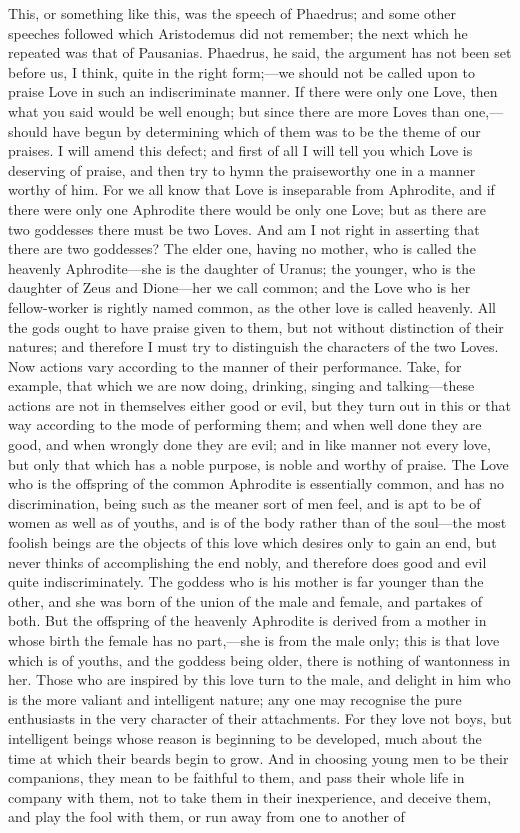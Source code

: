\documentclass[11pt,letter]{article}
\begin{document}
\par  This, or something like this, was the speech of Phaedrus; and some other speeches followed which Aristodemus did not remember; the next which he repeated was that of Pausanias. Phaedrus, he said, the argument has not been set before us, I think, quite in the right form;—we should not be called upon to praise Love in such an indiscriminate manner. If there were only one Love, then what you said would be well enough; but since there are more Loves than one,—should have begun by determining which of them was to be the theme of our praises. I will amend this defect; and first of all I will tell you which Love is deserving of praise, and then try to hymn the praiseworthy one in a manner worthy of him. For we all know that Love is inseparable from Aphrodite, and if there were only one Aphrodite there would be only one Love; but as there are two goddesses there must be two Loves. And am I not right in asserting that there are two goddesses? The elder one, having no mother, who is called the heavenly Aphrodite—she is the daughter of Uranus; the younger, who is the daughter of Zeus and Dione—her we call common; and the Love who is her fellow-worker is rightly named common, as the other love is called heavenly. All the gods ought to have praise given to them, but not without distinction of their natures; and therefore I must try to distinguish the characters of the two Loves. Now actions vary according to the manner of their performance. Take, for example, that which we are now doing, drinking, singing and talking—these actions are not in themselves either good or evil, but they turn out in this or that way according to the mode of performing them; and when well done they are good, and when wrongly done they are evil; and in like manner not every love, but only that which has a noble purpose, is noble and worthy of praise. The Love who is the offspring of the common Aphrodite is essentially common, and has no discrimination, being such as the meaner sort of men feel, and is apt to be of women as well as of youths, and is of the body rather than of the soul—the most foolish beings are the objects of this love which desires only to gain an end, but never thinks of accomplishing the end nobly, and therefore does good and evil quite indiscriminately. The goddess who is his mother is far younger than the other, and she was born of the union of the male and female, and partakes of both. But the offspring of the heavenly Aphrodite is derived from a mother in whose birth the female has no part,—she is from the male only; this is that love which is of youths, and the goddess being older, there is nothing of wantonness in her. Those who are inspired by this love turn to the male, and delight in him who is the more valiant and intelligent nature; any one may recognise the pure enthusiasts in the very character of their attachments. For they love not boys, but intelligent beings whose reason is beginning to be developed, much about the time at which their beards begin to grow. And in choosing young men to be their companions, they mean to be faithful to them, and pass their whole life in company with them, not to take them in their inexperience, and deceive them, and play the fool with them, or run away from one to another of 
\end{document}
